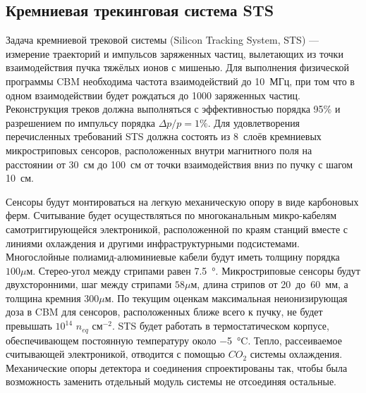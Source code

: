 \subsection{Кремниевая трекинговая система STS}\label{sec:secSTS}


Задача кремниевой трековой системы (Silicon Tracking System, STS) --- измерение траекторий и импульсов заряженных частиц, вылетающих из точки взаимодействия пучка тяжёлых ионов с мишенью. Для выполнения физической программы CBM необходима частота взаимодействий до 10~МГц, при том что в одном взаимодействии будет рождаться до 1000 заряженных частиц. Реконструкция треков должна выполняться с эффективностью порядка 95\% и разрешением по импульсу порядка $\Delta p / p = 1\%$. Для удовлетворения перечисленных требований STS должна состоять из 8~слоёв кремниевых микростриповых сенсоров, расположенных внутри магнитного поля на расстоянии от 30~см до 100~см от точки взаимодействия вниз по пучку с шагом 10~см.


Сенсоры будут монтироваться на легкую механическую опору в виде карбоновых ферм. Считывание будет осуществляться по многоканальным микро-кабелям самотриггирующейся электроникой, расположенной по краям станций вместе с линиями охлаждения и другими инфраструктурными подсистемами.
Многослойные полиамид-алюминиевые кабели будут иметь толщину порядка $100 \mu$м.
Стерео-угол между стрипами равен \SI{7.5}{\degree}.
Микростриповые сенсоры будут двухсторонними, шаг между стрипами $58 \mu$м, длина стрипов от 20~до~60~мм, а толщина кремния $300 \mu$м. По текущим оценкам максимальная неионизирующая доза в CBM для сенсоров, расположенных ближе всего к пучку, не будет превышать $10^{14}$ $n_{eq}$ см$^{-2}$. STS будет работать в термостатическом корпусе, обеспечивающем постоянную температуру около \SI{-5}{\degreeCelsius}. Тепло, рассеиваемое считывающей электроникой, отводится с помощью $CO_{2}$ системы охлаждения. Механические опоры детектора и соединения спроектированы так, чтобы была возможность заменить отдельный модуль системы не отсоединяя остальные.

